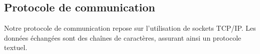\subsection{Protocole de communication} \label{protocole_com}

Notre protocole de communication repose sur l'utilisation de sockets TCP/IP. Les données échangées sont des chaînes de caractères, assurant ainsi un protocole textuel.






